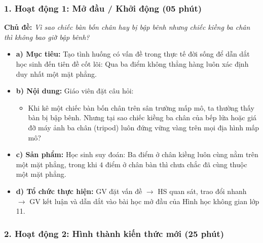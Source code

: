 \documentclass[12pt, a4paper]{article}
\begin{document}
\subsubsection*{1. Hoạt động 1: Mở đầu / Khởi động (05 phút)}
\textbf{Chủ đề:} \textit{Vì sao chiếc bàn bốn chân hay bị bập bênh nhưng chiếc kiềng ba chân thì không bao giờ bập bênh?}
\begin{itemize}
    \item \textbf{a) Mục tiêu:} Tạo tình huống có vấn đề trong thực tế đời sống để dẫn dắt học sinh đến tiên đề cốt lõi: Qua ba điểm không thẳng hàng luôn xác định duy nhất một mặt phẳng.
    \item \textbf{b) Nội dung:} Giáo viên đặt câu hỏi:
    \begin{itemize}
        \item Khi kê một chiếc bàn bốn chân trên sân trường mấp mô, ta thường thấy bàn bị bập bênh. Nhưng tại sao chiếc kiềng ba chân của bếp lửa hoặc giá đỡ máy ảnh ba chân (tripod) luôn đứng vững vàng trên mọi địa hình mấp mô?
    \end{itemize}
    \item \textbf{c) Sản phẩm:} Học sinh suy đoán: Ba điểm ở chân kiềng luôn cùng nằm trên một mặt phẳng, trong khi $4$ điểm ở chân bàn thì chưa chắc đã cùng thuộc một mặt phẳng.
    \item \textbf{d) Tổ chức thực hiện:} GV đặt vấn đề $\to$ HS quan sát, trao đổi nhanh $\to$ GV kết luận và dẫn dắt vào bài học mở đầu của Hình học không gian lớp 11.
\end{itemize}

\subsubsection*{2. Hoạt động 2: Hình thành kiến thức mới (25 phút)}
\end{document}
